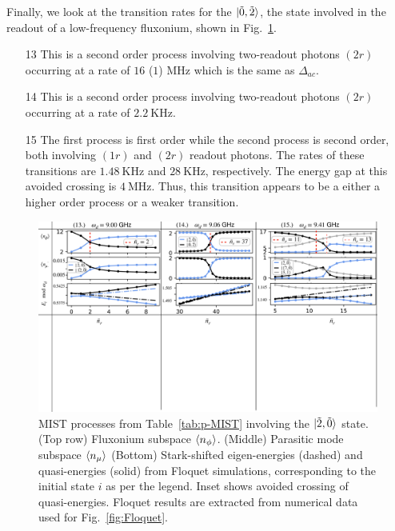 \documentclass[%
reprint,
superscriptaddress,
 amsmath,amssymb,
 aps,
 prx,
longbibliography,
floatfix,
]{revtex4-2}
\begin{document}
Finally, we look at the transition rates for the $\ket{\tilde{0},\tilde{2}}$, the state involved in the readout of a low-frequency fluxonium, shown in Fig.~\ref{fig:Trans2}.
\begin{itemize}
    \item[13] This is a second order process involving two-readout photons $(2r)$ occurring at a rate of $16$ ($1$) MHz which is the same as $\Delta_{ac}$.
    \item[14] This is a second order process involving two-readout photons $(2r)$ occurring at a rate of $2.2 \ \mathrm{KHz}$.
    \item[15] The first process is first order while the second process is second order, both involving $(1r)$ and $(2r)$ readout photons. The rates of these transitions are $1.48 \ \mathrm{KHz}$ and $28 \ \mathrm{KHz}$, respectively. The energy gap at this avoided crossing is $4 \ \mathrm{MHz}$. Thus, this transition appears to be a either a higher order process or a weaker transition.
\end{itemize}
\begin{figure}
    \centering
    \includegraphics[width=1.0\textwidth]{Figures/Trans2.pdf}
    \caption{MIST processes from Table~\ref{tab:p-MIST} involving the $\ket{\tilde{2},\tilde{0}}$ state. (Top row) Fluxonium subspace $\braket{n_\phi}$. (Middle) Parasitic mode subspace $\braket{n_\mu}$ (Bottom) Stark-shifted eigen-energies (dashed) and quasi-energies (solid) from Floquet simulations, corresponding to the initial state $i$ as per the legend. Inset shows avoided crossing of quasi-energies. Floquet results are extracted from numerical data used for Fig.~\ref{fig:Floquet}.}
    \label{fig:Trans2}
\end{figure}
\end{document}
